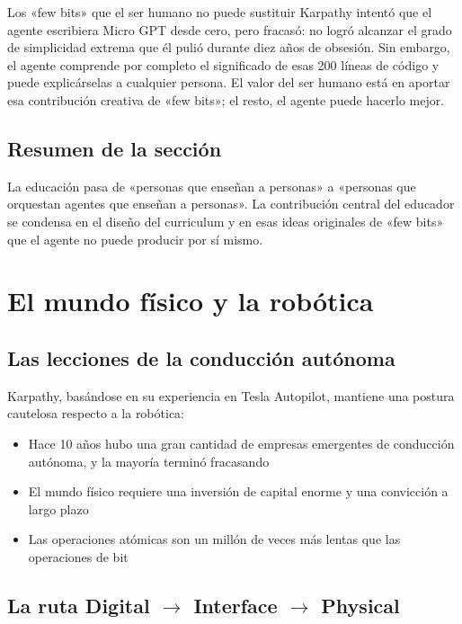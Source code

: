 \documentclass[a4paper]{article}
\begin{document}
\begin{knowledgebox}{Los «few bits» que el ser humano no puede sustituir}
Karpathy intentó que el agente escribiera Micro GPT desde cero, pero fracasó: no logró alcanzar el grado de simplicidad extrema que él pulió durante diez años de obsesión. Sin embargo, el agente comprende por completo el significado de esas 200 líneas de código y puede explicárselas a cualquier persona. El valor del ser humano está en aportar esa contribución creativa de «few bits»; el resto, el agente puede hacerlo mejor.
\end{knowledgebox}

\subsection{Resumen de la sección}

La educación pasa de «personas que enseñan a personas» a «personas que orquestan agentes que enseñan a personas». La contribución central del educador se condensa en el diseño del curriculum y en esas ideas originales de «few bits» que el agente no puede producir por sí mismo.


\section{El mundo físico y la robótica}

\subsection{Las lecciones de la conducción autónoma}

Karpathy, basándose en su experiencia en Tesla Autopilot, mantiene una postura cautelosa respecto a la robótica:
\begin{itemize}
    \item Hace 10 años hubo una gran cantidad de empresas emergentes de conducción autónoma, y la mayoría terminó fracasando
    \item El mundo físico requiere una inversión de capital enorme y una convicción a largo plazo
    \item Las operaciones atómicas son un millón de veces más lentas que las operaciones de bit
\end{itemize}

\subsection{La ruta Digital $\rightarrow$ Interface $\rightarrow$ Physical}
\end{document}
